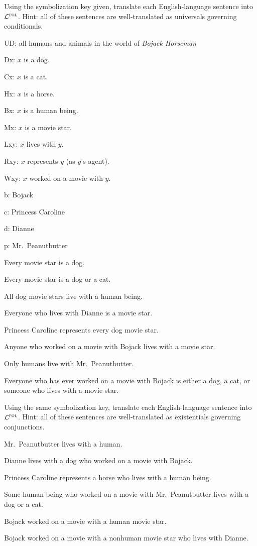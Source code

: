 


\practiceproblems

\problempart
\label{pr.$\FOL$bojackall}
Using the symbolization key given, translate each English-language sentence into $\FOL$. Hint: all of these sentences are well-translated as universals governing conditionals.
\begin{ekey}
\item[UD:] all humans and animals in the world of \emph{Bojack Horseman}
\item[Dx:] $x$ is a dog.
\item[Cx:] $x$ is a cat.
\item[Hx:] $x$ is a horse.
\item[Bx:] $x$ is a human being.
\item[Mx:] $x$ is a movie star.
\item[Lxy:] $x$ lives with $y$.
\item[Rxy:] $x$ represents $y$ (as $y$'s agent).
\item[Wxy:] $x$ worked on a movie with $y$.
\item[b:] Bojack
\item[c:] Princess Caroline
\item[d:] Dianne
\item[p:] Mr.\ Peanutbutter
\end{ekey}
\begin{earg}
\item Every movie star is a dog.
\item Every movie star is a dog or a cat.
\item All dog movie stars live with a human being.
\item Everyone who lives with Dianne is a movie star.
\item Princess Caroline represents every dog movie star.
\item Anyone who worked on a movie with Bojack lives with a movie star.
\item Only humans live with Mr.\ Peanutbutter.
\item Everyone who has ever worked on a movie with Bojack is either a dog, a cat, or someone who lives with a movie star.
\end{earg}

\solutions
\problempart
\label{pr.$\FOL$bojacksome}
Using the same symbolization key, translate each English-language sentence into $\FOL$. Hint: all of these sentences are well-translated as existentials governing conjunctions.
\begin{earg}
\item Mr.\ Peanutbutter lives with a human.
\item Dianne lives with a dog who worked on a movie with Bojack.
\item Princess Caroline represents a horse who lives with a human being.
\item Some human being who worked on a movie with Mr.\ Peanutbutter lives with a dog or a cat.
\item Bojack worked on a movie with a human movie star.
\item Bojack worked on a movie with a nonhuman movie star who lives with Dianne.
\end{earg}

